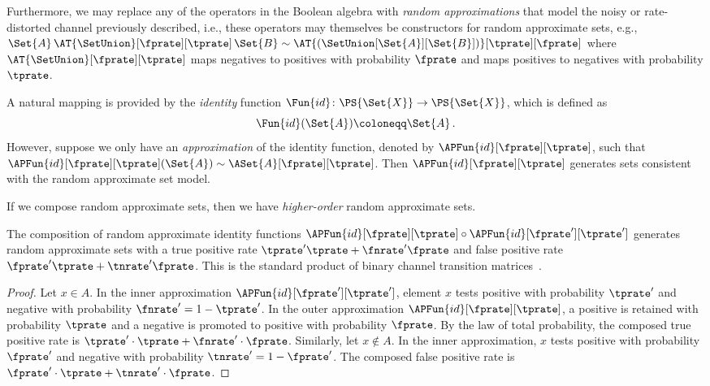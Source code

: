 Furthermore, we may replace any of the operators in the Boolean algebra with \emph{random approximations} that model the noisy or rate-distorted channel previously described, i.e., these operators may themselves be constructors for random approximate sets, e.g., $\Set{A} \, \AT{\SetUnion}[\fprate][\tprate] \, \Set{B} \sim \AT{(\SetUnion[\Set{A}][\Set{B}])}[\tprate][\fprate]$ where $\AT{\SetUnion}[\fprate][\tprate]$ maps negatives to positives with probability $\fprate$ and maps positives to negatives with probability $\tprate$.

A natural mapping is provided by the \emph{identity} function $\Fun{id} \colon \PS{\Set{X}} \to \PS{\Set{X}}$, which is defined as
\begin{equation}
\Fun{id}(\Set{A}) \coloneqq \Set{A}\,.
\end{equation}
However, suppose we only have an \emph{approximation} of the identity function, denoted by $\APFun{id}[\fprate][\tprate]$, such that $\APFun{id}[\fprate][\tprate](\Set{A}) \sim \ASet{A}[\fprate][\tprate]$.
Then $\APFun{id}[\fprate][\tprate]$ generates sets consistent with the random approximate set model.

If we compose random approximate sets, then we have \emph{higher-order} random approximate sets.
\begin{theorem}
\label{thm:composition_rates}
	The composition of random approximate identity functions $\APFun{id}[\fprate][\tprate] \circ \APFun{id}[\fprate'][\tprate']$ generates random approximate sets with a true positive rate $\tprate' \tprate + \fnrate' \fprate$ and false positive rate $\fprate' \tprate + \tnrate' \fprate$.
	This is the standard product of binary channel transition matrices~\cite{coverThomas}.
\end{theorem}
\begin{proof}
	Let $x \in A$. In the inner approximation $\APFun{id}[\fprate'][\tprate']$, element $x$ tests positive with probability $\tprate'$ and negative with probability $\fnrate' = 1 - \tprate'$.
	In the outer approximation $\APFun{id}[\fprate][\tprate]$, a positive is retained with probability $\tprate$ and a negative is promoted to positive with probability $\fprate$.
	By the law of total probability, the composed true positive rate is
	$\tprate' \cdot \tprate + \fnrate' \cdot \fprate$.
	Similarly, let $x \notin A$. In the inner approximation, $x$ tests positive with probability $\fprate'$ and negative with probability $\tnrate' = 1 - \fprate'$.
	The composed false positive rate is
	$\fprate' \cdot \tprate + \tnrate' \cdot \fprate$.
\end{proof}

